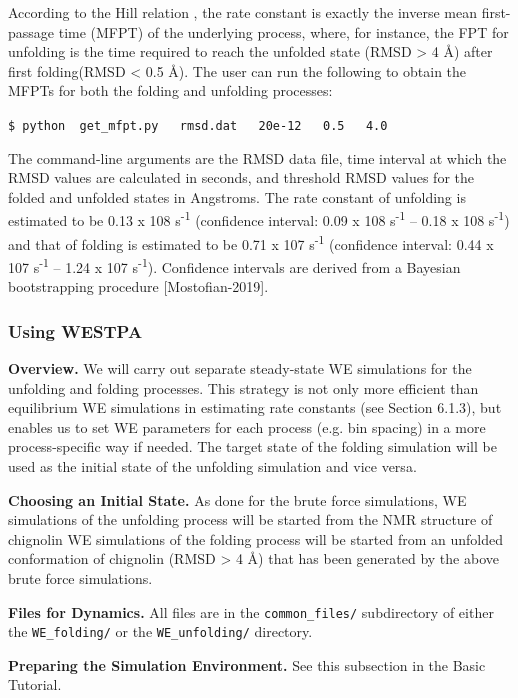 \documentclass[9pt,tutorial]{livecoms}
\begin{document}
According to the Hill relation \citep{Hill1989}, the rate constant is exactly the inverse mean first-passage time (MFPT) of the underlying process, where, for instance, the FPT for unfolding is the time required to reach the unfolded state (RMSD > 4 \AA) after first folding(RMSD < 0.5 \AA). 
The user can run the following to obtain the MFPTs for both the folding and unfolding processes: 

\verb|$ python  get_mfpt.py   rmsd.dat   20e-12   0.5   4.0|

The command-line arguments are the RMSD data file, time interval at which the RMSD values are calculated in seconds, and threshold RMSD values for the folded and unfolded states in Angstroms. 
The rate constant of unfolding is estimated to be 0.13 x 108 s\textsuperscript{-1} (confidence interval: 0.09 x 108 s\textsuperscript{-1} – 0.18 x 108 s\textsuperscript{-1}) and that of folding is estimated to be 0.71 x 107 s\textsuperscript{-1} (confidence interval: 0.44 x 107 s\textsuperscript{-1} – 1.24 x 107 s\textsuperscript{-1}). 
Confidence intervals are derived from a Bayesian bootstrapping procedure [Mostofian-2019]. 

\subsubsection{Using WESTPA}

\textbf{Overview.} We will carry out separate steady-state WE simulations for the unfolding and folding processes. 
This strategy is not only more efficient than equilibrium WE simulations in estimating rate constants (see Section 6.1.3), but enables us to set WE parameters for each process (e.g. bin spacing) in a more process-specific way if needed. 
The target state of the folding simulation will be used as the initial state of the unfolding simulation and vice versa. 

\textbf{Choosing an Initial State.} As done for the brute force simulations, WE simulations of the unfolding process will be started from the NMR structure of chignolin WE simulations of the folding process will be started from an unfolded conformation of chignolin (RMSD > 4 \AA) that has been generated by the above brute force simulations.
 
\textbf{Files for Dynamics.} All files are in the \verb|common_files/| subdirectory of either the \verb|WE_folding/| or the \verb|WE_unfolding/| directory.
 
\textbf{Preparing the Simulation Environment.} See this subsection in the Basic Tutorial.
 
\end{document}
